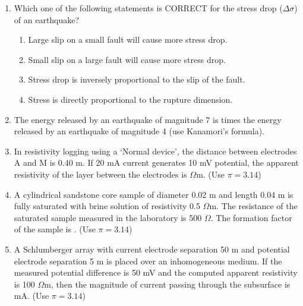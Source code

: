 \documentclass[journal,12pt,onecolumn]{IEEEtran}
\begin{document}
\begin{enumerate}
\begin{enumerate}
\item Which one of the following statements is CORRECT for the stress drop ($\Delta\sigma$) of an earthquake?

\hfill{}


\begin{enumerate}[label=(\Alph*)]
\item Large slip on a small fault will cause more stress drop.
\item Small slip on a large fault will cause more stress drop.
\item Stress drop is inversely proportional to the slip of the fault.
\item Stress is directly proportional to the rupture dimension.
\end{enumerate}


\item The energy released by an earthquake of magnitude 7 is \underline{\hspace{3cm}} times the energy released by an earthquake of magnitude 4 (use Kanamori's formula).

\hfill{}

\item In resistivity logging using a `Normal device', the distance between electrodes A and M is 0.40 m. If 20 mA current generates 10 mV potential, the apparent resistivity of the layer between the electrodes is \underline{\hspace{3cm}} $\Omega$m. (Use $\pi=3.14$)

\hfill{}

\item A cylindrical sandstone core sample of diameter 0.02 m and length 0.04 m is fully saturated with brine solution of resistivity 0.5 $\Omega$m. The resistance of the saturated sample measured in the laboratory is 500 $\Omega$. The formation factor of the sample is \underline{\hspace{3cm}}. (Use $\pi=3.14$)

\hfill{}

\item A Schlumberger array with current electrode separation 50 m and potential electrode separation 5 m is placed over an inhomogeneous medium. If the measured potential difference is 50 mV and the computed apparent resistivity is 100 $\Omega$m, then the magnitude of current passing through the subsurface is \underline{\hspace{3cm}} mA. (Use $\pi=3.14$)


\end{enumerate}
\end{enumerate}
\end{document}
